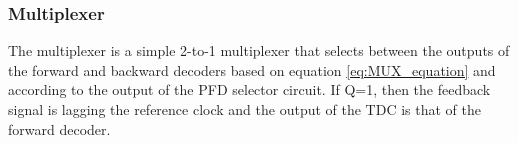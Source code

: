 \subsubsection{Multiplexer}
The multiplexer is a simple 2-to-1 multiplexer that selects between the outputs of the forward and backward decoders based on equation \ref{eq:MUX_equation} and according to the output of the PFD selector circuit.
If Q=1, then the feedback signal is lagging the reference clock and the output of the TDC is that of the forward decoder.                                                                                                                                                                                                                                                                                                                                                                                                                                                                                                                                                                                                                                                                                                                                                                                                                                                                                                                                                                                                                                                                                                                                                                                                                                                                                                                                                                                                                                                                                                                                                                                                                                                                                                                                                                                                                                                                                                                                                                                                                                                                                                                                                                                                                                                                                                                                                                                                                                                                                                                                                                                                                                                                                                                                                                                                                                                                             